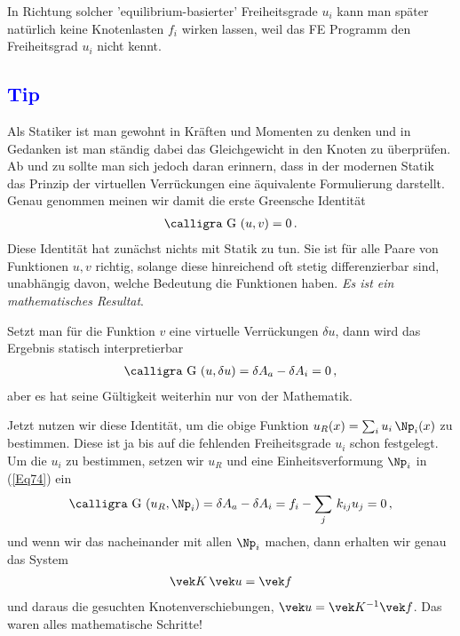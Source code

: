 {{In Richtung solcher 'equilibrium-basierter' Freiheitsgrade $u_i$ kann man sp\"{a}ter nat\"{u}rlich keine Knotenlasten $f_i$ wirken lassen, weil das FE Programm den Freiheitsgrad $u_i$ nicht kennt.

{\textcolor{blue}{\subsection{Tip}}
Als Statiker ist man gewohnt in Kr\"{a}ften und Momenten zu denken und in Gedanken ist man st\"{a}ndig dabei das Gleichgewicht in den Knoten zu \"{u}berpr\"{u}fen. Ab und zu sollte man sich jedoch daran erinnern, dass in der modernen Statik das Prinzip der virtuellen Verr\"{u}ckungen eine \"{a}quivalente Formulierung darstellt. Genau genommen meinen wir damit die erste Greensche Identit\"{a}t
\begin{align}
\text{\normalfont\calligra G\,\,}(u,v) = 0\,.
\end{align}
Diese Identit\"{a}t hat zun\"{a}chst nichts mit Statik zu tun. Sie ist f\"{u}r alle Paare von Funktionen $u, v$ richtig, solange diese hinreichend oft stetig differenzierbar sind, unabh\"{a}ngig davon, welche Bedeutung die Funktionen haben. {\em Es ist ein mathematisches Resultat\/}.

Setzt man f\"{u}r die Funktion $v$ eine virtuelle Verr\"{u}ckungen $\delta u$, dann wird das Ergebnis statisch interpretierbar
\begin{align} \label{Eq74}
\text{\normalfont\calligra G\,\,}(u,\delta u) = \delta A_a - \delta A_i = 0\,,
\end{align}
aber es hat seine G\"{u}ltigkeit weiterhin nur von der Mathematik.

Jetzt nutzen wir diese Identit\"{a}t, um die obige Funktion $u_R(x) = \sum_i u_i\,\Np_i(x)$ zu bestimmen. Diese ist ja bis auf die fehlenden Freiheitsgrade $u_i$ schon festgelegt. Um die $u_i$
zu bestimmen, setzen wir $u_R$ und eine Einheitsverformung $\Np_i$ in (\ref{Eq74}) ein
\begin{align}
\text{\normalfont\calligra G\,\,}(u_R,\Np_i) = \delta A_a - \delta A_i = f_i - \sum_j\,k_{ij} u_j = 0\,,
\end{align}
und wenn wir das nacheinander mit allen $\Np_i$ machen, dann erhalten wir genau das System
\begin{align}
\vek K\,\vek u = \vek f
\end{align}
und daraus die gesuchten Knotenverschiebungen, $\vek u = \vek K^{-1} \vek f$. Das waren alles mathematische Schritte!

}}}
